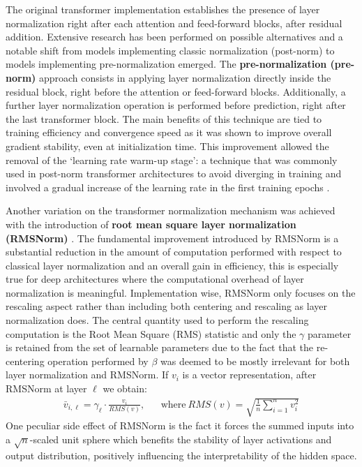 The original transformer implementation establishes the presence of layer normalization right after each attention and feed-forward blocks, after residual addition.
Extensive research has been performed on possible alternatives and a notable shift from models implementing classic normalization (post-norm) to models implementing pre-normalization emerged.
The \textbf{pre-normalization (pre-norm)}    approach consists in applying layer normalization directly inside the residual block, right before the attention or feed-forward blocks.
Additionally, a further layer normalization operation is performed before prediction, right after the last transformer block.
The main benefits of this technique are tied to training efficiency and convergence speed  as it was shown to improve overall gradient stability, even at initialization time.
This improvement allowed the removal of the `learning rate warm-up stage': a technique that was commonly used in post-norm transformer architectures to avoid diverging in training  and involved a gradual increase of the learning rate in the first training epochs .

Another variation on the transformer normalization mechanism was achieved with the introduction of \textbf{root mean square layer normalization (RMSNorm)} .
The fundamental improvement introduced by RMSNorm is a substantial reduction in the amount of computation performed with respect to classical layer normalization and an overall gain in efficiency, this is especially true for deep architectures where the computational overhead of layer normalization is meaningful.
Implementation wise, RMSNorm only focuses on the rescaling aspect rather than including both centering and rescaling as layer normalization does.
The central quantity used to perform the rescaling computation is the Root Mean Square (RMS) statistic and only the $\gamma$ parameter is retained from the set of learnable parameters due to the fact that the re-centering operation performed by $\beta$ was deemed to be mostly irrelevant for both layer normalization and RMSNorm.
If $v_i$ is a vector representation, after RMSNorm at layer $\ell$ we obtain:
\begin{equation}
    \label{eq:background_rmsnorm}
    \begin{aligned}
        \bar v_{i,\ell} = \gamma_\ell \cdot \frac{v_i}{RMS(v)}, &&
        \text{where}\ RMS(v) = \sqrt{\frac{1}{n}\sum_{i=1}^{n}{v_i^2}}
    \end{aligned}
\end{equation}
One peculiar side effect of RMSNorm is the fact it forces the summed inputs into a $\sqrt{n}$-scaled unit sphere which benefits the stability of layer activations and output distribution, positively influencing the interpretability of the hidden space.

